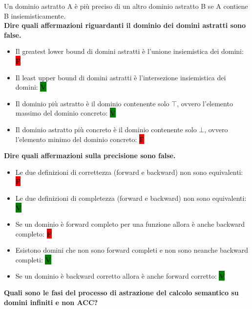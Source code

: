 \documentclass[a4paper,oneside,titlepage]{book}
\begin{document}
Un dominio astratto A è più preciso di un altro dominio astratto B se A contiene B insiemisticamente.
\bigskip
\\
\textbf{Dire quali affermazioni riguardanti il dominio dei domini astratti sono false.}
\begin{itemize}
    \item Il greatest lower bound di domini astratti è l'unione insiemistica dei domini: \colorbox{red}{\textbf{F}}
    \item Il least upper bound di domini astratti è l'intersezione insiemistica dei domini: \colorbox{green}{\textbf{V}}
    \item Il dominio più astratto è il dominio contenente solo $\top$, ovvero l'elemento massimo del dominio concreto: \colorbox{green}{\textbf{V}}
    \item Il dominio astratto più concreto è il dominio contenente solo $\bot$, ovvero l'elemento minimo del dominio concreto: \colorbox{red}{\textbf{F}}
\end{itemize}
\noindent
\textbf{Dire quali affermazioni sulla precisione sono false.}
\begin{itemize}
    \item Le due definizioni di correttezza (forward e backward) non sono equivalenti: \colorbox{red}{\textbf{F}}
    \item Le due definizioni di completezza (forward e backward) non sono equivalenti: \colorbox{green}{\textbf{V}}
    \item Se un dominio è forward completo per una funzione allora è anche backward completo: \colorbox{red}{\textbf{F}}
    \item Esistono domini che non sono forward completi e non sono neanche backward completi: \colorbox{green}{\textbf{V}}
    \item Se un dominio è backward corretto allora è anche forward corretto: \colorbox{green}{\textbf{V}}
\end{itemize}
\noindent
\textbf{Quali sono le fasi del processo di astrazione del calcolo semantico su domini infiniti e non ACC?}
\end{document}
